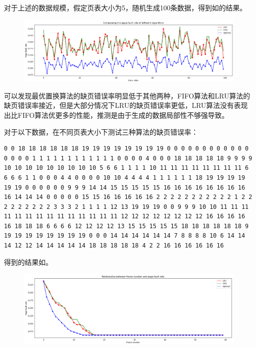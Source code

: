 \documentclass[lang=cn,11pt,a4paper,cite=authornum]{paper}
\begin{document}
对于上述的数据规模，假定页表大小为5，随机生成100条数据，得到如的结果。

\begin{figure}[htbp]

    \centering
    \includegraphics[width=\textwidth]{./images/Figure_1.png}
    \caption{\label{fig:1}}

\end{figure}

可以发现最优置换算法的缺页错误率明显低于其他两种，FIFO算法和LRU算法的缺页错误率接近，但是大部分情况下LRU的缺页错误率更低，LRU算法没有表现出比FIFO算法优更多的性能，推测是由于生成的数据局部性不够强导致。

对于以下数据，在不同页表大小下测试三种算法的缺页错误率：

\begin{code}
\begin{verbatim}
0 0 18 18 18 18 18 18 19 19 19 19 19 19 19 19 0 0 0 0 0 0 0 0 0 0 0 0 0 0 0 0 1 1 1 1 1 1 1 1 1 1 1 1 0 0 0 0 4 0 0 0 18 18 18 18 18 9 9 9 9 10 10 10 10 10 10 10 10 10 5 6 6 1 1 1 1 10 11 11 11 11 11 11 11 11 6 6 6 6 1 1 0 0 0 4 4 0 0 0 0 10 10 4 4 4 4 1 1 1 1 1 1 18 19 19 19 19 19 19 0 0 0 0 0 0 9 9 9 14 14 15 15 15 15 15 16 16 16 16 16 16 16 16 16 14 14 14 0 0 0 0 0 15 15 16 16 16 16 16 2 2 2 2 2 2 2 2 2 2 2 1 2 2 2 2 2 2 2 2 2 3 3 3 2 1 1 1 1 12 13 19 19 19 0 0 9 9 9 10 10 11 11 11 11 11 11 11 11 11 11 11 11 11 11 12 12 12 12 12 12 12 12 16 16 16 16 16 18 18 18 6 6 6 6 12 12 12 12 13 15 15 15 15 15 18 18 18 18 18 18 9 19 19 19 19 19 19 19 19 0 0 0 14 14 14 14 14 14 7 8 8 8 8 10 6 14 14 14 12 12 14 14 14 14 14 18 18 18 18 18 4 2 2 16 16 16 16 16 16
\end{verbatim}
\end{code}

得到的结果如。

\begin{figure}[htbp]

    \centering
    \includegraphics[width=\textwidth]{./images/Figure_2.png}
    \caption{\label{fig:2}}

\end{figure}
\end{document}
